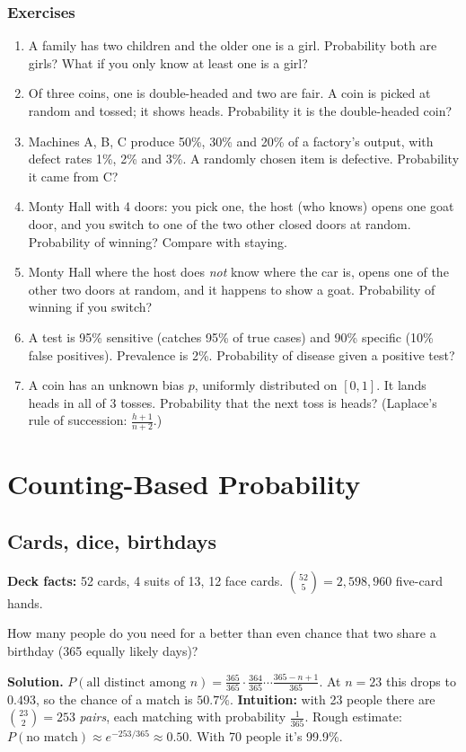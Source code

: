 \documentclass[11pt,a4paper,openany]{report}
\newenvironment{exercises}{\subsection*{Exercises \thechapter}\begin{enumerate}[label=\textbf{\thechapter.\arabic*},leftmargin=3.2em]}{\end{enumerate}}
\newcommand{\C}[2]{\binom{#1}{#2}}
\begin{document}
\begin{exercises}
\item A family has two children and the older one is a girl. Probability both are girls? What if you only know at least one is a girl?
\item Of three coins, one is double-headed and two are fair. A coin is picked at random and tossed; it shows heads. Probability it is the double-headed coin?
\item Machines A, B, C produce 50\%, 30\% and 20\% of a factory's output, with defect rates 1\%, 2\% and 3\%. A randomly chosen item is defective. Probability it came from C?
\item Monty Hall with 4 doors: you pick one, the host (who knows) opens one goat door, and you switch to one of the two other closed doors at random. Probability of winning? Compare with staying.
\item Monty Hall where the host does \emph{not} know where the car is, opens one of the other two doors at random, and it happens to show a goat. Probability of winning if you switch?
\item A test is 95\% sensitive (catches 95\% of true cases) and 90\% specific (10\% false positives). Prevalence is 2\%. Probability of disease given a positive test?
\item A coin has an unknown bias $p$, uniformly distributed on $[0,1]$. It lands heads in all of 3 tosses. Probability that the next toss is heads? (Laplace's rule of succession: $\frac{h+1}{n+2}$.)
\end{exercises}

\chapter{Counting-Based Probability}\label{ch:cprob}

\section{Cards, dice, birthdays}
\textbf{Deck facts:} 52 cards, 4 suits of 13, 12 face cards. $\C{52}5=2{,}598{,}960$ five-card hands.

\begin{example}
How many people do you need for a better than even chance that two share a birthday (365 equally likely days)?

\textbf{Solution.} $P(\text{all distinct among }n)=\frac{365}{365}\cdot\frac{364}{365}\cdots\frac{365-n+1}{365}$. At $n=23$ this drops to $0.493$, so the chance of a match is $\mathbf{50.7\%}$.
\textbf{Intuition:} with 23 people there are $\C{23}2=253$ \emph{pairs}, each matching with probability $\frac1{365}$. Rough estimate: $P(\text{no match})\approx e^{-253/365}\approx0.50$. With 70 people it's 99.9\%.
\end{example}
\end{document}
